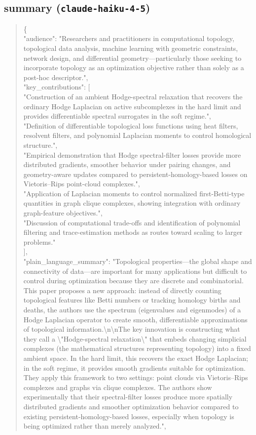 \documentclass[11pt]{article}
\begin{document}
\subsection*{summary (\texttt{claude-haiku-4-5})}
\begin{quote}\small\ttfamily\raggedright
\{\\
  "audience": "Researchers and practitioners in computational topology, topological data analysis, machine learning with geometric constraints, network design, and differential geometry---particularly those seeking to incorporate topology as an optimization objective rather than solely as a post-hoc descriptor.",\\
  "key\_contributions": [\\
    "Construction of an ambient Hodge-spectral relaxation that recovers the ordinary Hodge Laplacian on active subcomplexes in the hard limit and provides differentiable spectral surrogates in the soft regime.",\\
    "Definition of differentiable topological loss functions using heat filters, resolvent filters, and polynomial Laplacian moments to control homological structure.",\\
    "Empirical demonstration that Hodge spectral-filter losses provide more distributed gradients, smoother behavior under pairing changes, and geometry-aware updates compared to persistent-homology-based losses on Vietoris--Rips point-cloud complexes.",\\
    "Application of Laplacian moments to control normalized first-Betti-type quantities in graph clique complexes, showing integration with ordinary graph-feature objectives.",\\
    "Discussion of computational trade-offs and identification of polynomial filtering and trace-estimation methods as routes toward scaling to larger problems."\\
  ],\\
  "plain\_language\_summary": "Topological properties---the global shape and connectivity of data---are important for many applications but difficult to control during optimization because they are discrete and combinatorial. This paper proposes a new approach: instead of directly counting topological features like Betti numbers or tracking homology births and deaths, the authors use the spectrum (eigenvalues and eigenmodes) of a Hodge Laplacian operator to create smooth, differentiable approximations of topological information.\textbackslash{}n\textbackslash{}nThe key innovation is constructing what they call a \textbackslash{}"Hodge-spectral relaxation\textbackslash{}" that embeds changing simplicial complexes (the mathematical structures representing topology) into a fixed ambient space. In the hard limit, this recovers the exact Hodge Laplacian; in the soft regime, it provides smooth gradients suitable for optimization. They apply this framework to two settings: point clouds via Vietoris--Rips complexes and graphs via clique complexes. The authors show experimentally that their spectral-filter losses produce more spatially distributed gradients and smoother optimization behavior compared to existing persistent-homology-based losses, especially when topology is being optimized rather than merely analyzed.",\\

\end{quote}
\end{document}

